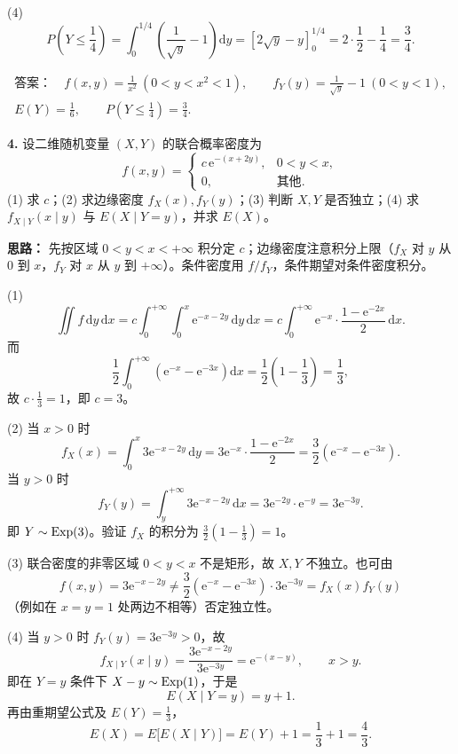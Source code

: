 (4)
\[
P\!\left(Y\leq\frac14\right)
=\int_0^{1/4}\left(\frac{1}{\sqrt y}-1\right)\mathrm dy
=\left[2\sqrt y-y\right]_0^{1/4}
=2\cdot\frac12-\frac14=\frac34.
\]

\[
\boxed{\begin{gathered}
\textbf{答案：}\quad f(x,y)=\frac{1}{x^2}\ (0<y<x^2<1),\qquad
f_Y(y)=\frac{1}{\sqrt y}-1\ (0<y<1),\\
E(Y)=\frac16,\qquad P\!\left(Y\leq\frac14\right)=\frac34.
\end{gathered}}
\]

\else \answerarea[10] \fi%
\textbf{4.} 设二维随机变量 $(X,Y)$ 的联合概率密度为
\[
f(x,y)=\begin{cases}
c\,\mathrm e^{-(x+2y)}, & 0<y<x,\\
0, & \text{其他}.
\end{cases}
\]
(1) 求 $c$；(2) 求边缘密度 $f_X(x),f_Y(y)$；(3) 判断 $X,Y$ 是否独立；(4) 求 $f_{X\mid Y}(x\mid y)$ 与 $E(X\mid Y=y)$，并求 $E(X)$。

\ifshowsolutions%
\textbf{思路：} 先按区域 $0<y<x<+\infty$ 积分定 $c$；边缘密度注意积分上限（$f_X$ 对 $y$ 从 $0$ 到 $x$，$f_Y$ 对 $x$ 从 $y$ 到 $+\infty$）。条件密度用 $f/f_Y$，条件期望对条件密度积分。

(1)
\[
\iint f\,\mathrm dy\,\mathrm dx
=c\int_0^{+\infty}\!\!\int_0^x \mathrm e^{-x-2y}\,\mathrm dy\,\mathrm dx
=c\int_0^{+\infty}\mathrm e^{-x}\cdot\frac{1-\mathrm e^{-2x}}{2}\,\mathrm dx.
\]
而
\[
\frac12\int_0^{+\infty}\left(\mathrm e^{-x}-\mathrm e^{-3x}\right)\mathrm dx
=\frac12\left(1-\frac13\right)=\frac13,
\]
故 $c\cdot\frac13=1$，即 $c=3$。

(2) 当 $x>0$ 时
\[
f_X(x)=\int_0^x 3\mathrm e^{-x-2y}\,\mathrm dy
=3\mathrm e^{-x}\cdot\frac{1-\mathrm e^{-2x}}{2}
=\frac32\left(\mathrm e^{-x}-\mathrm e^{-3x}\right).
\]
当 $y>0$ 时
\[
f_Y(y)=\int_y^{+\infty}3\mathrm e^{-x-2y}\,\mathrm dx
=3\mathrm e^{-2y}\cdot \mathrm e^{-y}=3\mathrm e^{-3y}.
\]
即 $Y\sim \operatorname{Exp}(3)$。验证 $f_X$ 的积分为 $\frac32(1-\frac13)=1$。

(3) 联合密度的非零区域 $0<y<x$ 不是矩形，故 $X,Y$ 不独立。也可由
\[
f(x,y)=3\mathrm e^{-x-2y}\neq \frac32\left(\mathrm e^{-x}-\mathrm e^{-3x}\right)\cdot 3\mathrm e^{-3y}=f_X(x)f_Y(y)
\]
（例如在 $x=y=1$ 处两边不相等）否定独立性。

(4) 当 $y>0$ 时 $f_Y(y)=3\mathrm e^{-3y}>0$，故
\[
f_{X\mid Y}(x\mid y)=\frac{3\mathrm e^{-x-2y}}{3\mathrm e^{-3y}}
=\mathrm e^{-(x-y)},\qquad x>y.
\]
即在 $Y=y$ 条件下 $X-y\sim \operatorname{Exp}(1)$，于是
\[
E(X\mid Y=y)=y+1.
\]
再由重期望公式及 $E(Y)=\frac13$，
\[
E(X)=E\bigl[E(X\mid Y)\bigr]=E(Y)+1=\frac13+1=\frac43.
\]

